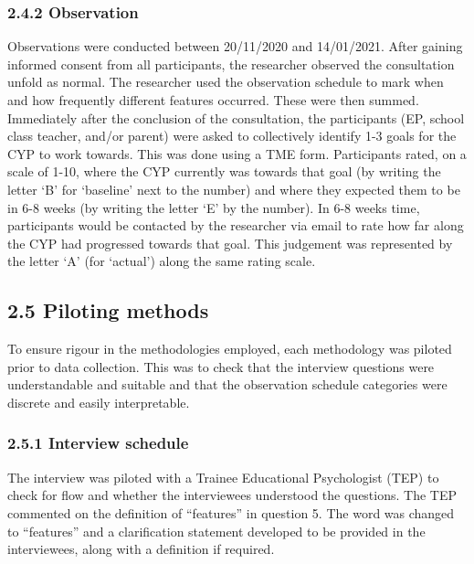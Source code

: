 \documentclass[
]{article}
\begin{document}
\hypertarget{observation-1}{%
\subsubsection{2.4.2 Observation}\label{observation-1}}

Observations were conducted between 20/11/2020 and 14/01/2021. After
gaining informed consent from all participants, the researcher observed
the consultation unfold as normal. The researcher used the observation
schedule to mark when and how frequently different features occurred.
These were then summed. Immediately after the conclusion of the
consultation, the participants (EP, school class teacher, and/or parent)
were asked to collectively identify 1-3 goals for the CYP to work
towards. This was done using a TME form. Participants rated, on a scale
of 1-10, where the CYP currently was towards that goal (by writing the
letter `B' for `baseline' next to the number) and where they expected
them to be in 6-8 weeks (by writing the letter `E' by the number). In
6-8 weeks time, participants would be contacted by the researcher via
email to rate how far along the CYP had progressed towards that goal.
This judgement was represented by the letter `A' (for `actual') along
the same rating scale.

\hypertarget{piloting-methods}{%
\subsection{2.5 Piloting methods}\label{piloting-methods}}

To ensure rigour in the methodologies employed, each methodology was
piloted prior to data collection. This was to check that the interview
questions were understandable and suitable and that the observation
schedule categories were discrete and easily interpretable.

\hypertarget{interview-schedule}{%
\subsubsection{2.5.1 Interview schedule}\label{interview-schedule}}

The interview was piloted with a Trainee Educational Psychologist (TEP)
to check for flow and whether the interviewees understood the questions.
The TEP commented on the definition of ``features'' in question 5. The
word was changed to ``features'' and a clarification statement developed
to be provided in the interviewees, along with a definition if required.
\end{document}
